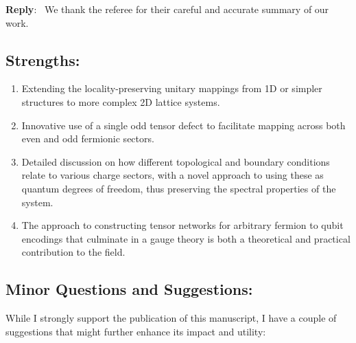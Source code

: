 \documentclass[aps,prx,floatfix,10pt,amssymb,amsfont,amsmath,superscriptaddress,float,nofootinbib,longbibliography,nobalancelastpage]{revtex4-2}
\newenvironment{reply}
   {\medskip \noindent \begin{sf}\textbf{Reply}:\ \color{blue}  }
   {\medskip \end{sf}}
\begin{document}
\begin{reply}
We thank the referee for their careful and accurate summary of our work.
\end{reply}

\subsection*{Strengths:}

\begin{enumerate}
\item Extending the locality-preserving unitary mappings from 1D or simpler structures to more complex 2D lattice systems.

\item Innovative use of a single odd tensor defect to facilitate mapping across both even and odd fermionic sectors.

\item Detailed discussion on how different topological and boundary conditions relate to various charge sectors, with a novel approach to using these as quantum degrees of freedom, thus preserving the spectral properties of the system.

\item The approach to constructing tensor networks for arbitrary fermion to qubit encodings that culminate in a gauge theory is both a theoretical and practical contribution to the field.
\end{enumerate}

\subsection*{Minor Questions and Suggestions:}


While I strongly support the publication of this manuscript, I have a couple of suggestions that might further enhance its impact and utility:
\end{document}
